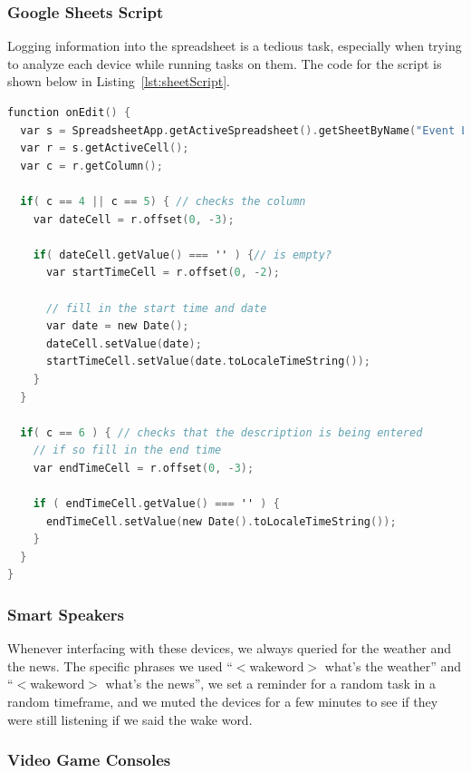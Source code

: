 \subsubsection{Google Sheets Script}

Logging information into the spreadsheet is a tedious task, especially when trying to analyze each device while running tasks on them. The code for the script is shown below in Listing~\ref{lst:sheetScript}.

\begin{minipage}{\textwidth}
\begin{lstlisting}[basicstyle=\linespread{0.95}\ttfamily, language=C,label={lst:sheetScript},caption={Open and Read from a Socket}]
function onEdit() {
  var s = SpreadsheetApp.getActiveSpreadsheet().getSheetByName("Event Log");
  var r = s.getActiveCell();
  var c = r.getColumn();

  if( c == 4 || c == 5) { // checks the column
    var dateCell = r.offset(0, -3);

    if( dateCell.getValue() === '' ) {// is empty?
      var startTimeCell = r.offset(0, -2);

      // fill in the start time and date
      var date = new Date();
      dateCell.setValue(date);
      startTimeCell.setValue(date.toLocaleTimeString());
    }
  }

  if( c == 6 ) { // checks that the description is being entered
    // if so fill in the end time
    var endTimeCell = r.offset(0, -3);

    if ( endTimeCell.getValue() === '' ) {
      endTimeCell.setValue(new Date().toLocaleTimeString());
    }
  }
}
\end{lstlisting}
\end{minipage}

\subsubsection{Smart Speakers}

Whenever interfacing with these devices, we always queried for the weather and the news. The specific phrases we used ``$<$wakeword$>$ what's the weather'' and ``$<$wakeword$>$ what's the news'', we  set a reminder for a random task in a random timeframe, and we muted the devices for a few minutes to see if they were still listening if we said the wake word.

\subsubsection{Video Game Consoles}

